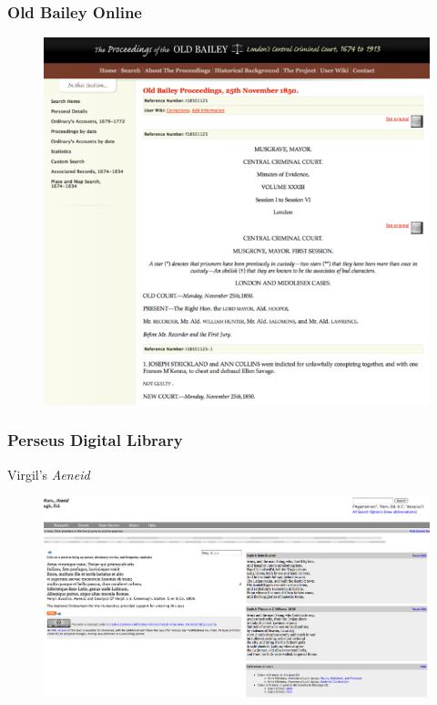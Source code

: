 \documentclass[ignorenonframetext,11pt]{beamer}
\begin{document}
\begin{frame}
\frametitle{Old Bailey Online}
\label{oldbaileyonline}

\begin{figure}
	\label{oldbailey}
	\begin{center}
	\includegraphics[keepaspectratio,width=\textwidth, height=.75\textheight]{images/oldbailey.png}
	\end{center}
	\end{figure}
	



\end{frame}
		

\begin{frame}
\frametitle{Perseus Digital Library}
\label{perseusdigitallibrary}

Virgil's {\itshape Aeneid}


\begin{figure}
	\label{aeneid}
	\begin{center}
	\includegraphics[keepaspectratio,width=\textwidth, height=.75\textheight]{images/aeneid60.png}
	\end{center}
	\end{figure}
	



\end{frame}
		
\end{document}
